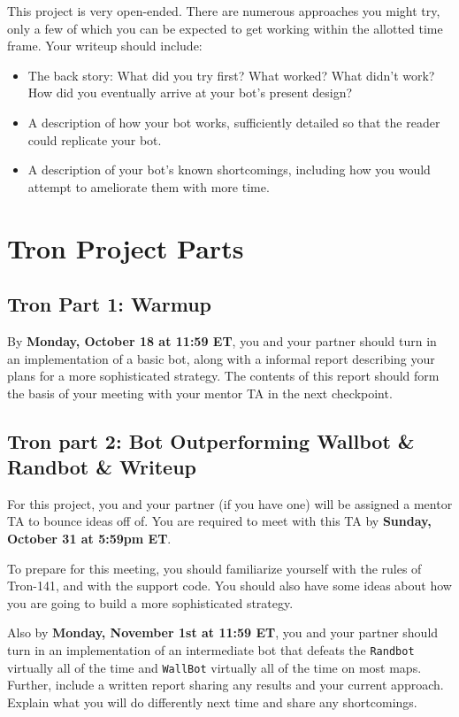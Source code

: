 \documentclass{article}
\begin{document}
This project is very open-ended.  There are numerous approaches you
might try, only a few of which you can be expected to get working
within the allotted time frame.  Your writeup should include:

\begin{itemize}
\item The back story: What did you try first?  What worked?  What
  didn't work?  How did you eventually arrive at your bot's present
  design?
  
\item A description of how your bot works, sufficiently detailed so
  that the reader could replicate your bot.

\item A description of your bot's known shortcomings, including how
  you would attempt to ameliorate them with more time.
\end{itemize}


\section{Tron Project Parts}
\subsection{Tron Part 1: Warmup}
By \textbf{Monday, October 18 at 11:59 ET}, you and your
partner should turn in an implementation of a basic bot, along with a
informal report describing your plans for a more sophisticated strategy. 
The contents of this report should form the basis of your meeting with
your mentor TA in the next checkpoint. 

\subsection{Tron part 2: Bot Outperforming Wallbot \& Randbot \& Writeup}
For this project, you and your partner (if you have one) will be
assigned a mentor TA to bounce ideas off of. You are required to
meet with this TA by \textbf{Sunday, October 31 at 5:59pm ET}.

To prepare for this meeting, you should familiarize yourself with the
rules of Tron-141, and with the support code. You should also have some ideas about how you are going to build a more sophisticated strategy.

Also by \textbf{Monday, November 1st at 11:59 ET}, you and your partner should turn in an implementation of an intermediate bot that defeats the \texttt{Randbot} virtually all of the time and \texttt{WallBot} virtually all of the time on most maps. Further, include a written report sharing any results and your current approach. Explain what you will do differently next time and share any shortcomings. 
\end{document}
